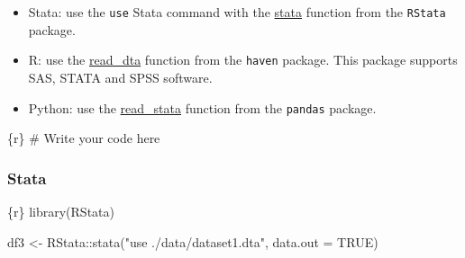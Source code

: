 \documentclass[
  letterpaper,
  DIV=11,
  numbers=noendperiod]{scrreprt}
\newenvironment{Shaded}{\begin{snugshade}}{\end{snugshade}}
\newcommand{\AttributeTok}[1]{\textcolor[rgb]{0.40,0.45,0.13}{#1}}
\newcommand{\CommentTok}[1]{\textcolor[rgb]{0.37,0.37,0.37}{#1}}
\newcommand{\ConstantTok}[1]{\textcolor[rgb]{0.56,0.35,0.01}{#1}}
\newcommand{\FunctionTok}[1]{\textcolor[rgb]{0.28,0.35,0.67}{#1}}
\newcommand{\InformationTok}[1]{\textcolor[rgb]{0.37,0.37,0.37}{#1}}
\newcommand{\NormalTok}[1]{\textcolor[rgb]{0.00,0.23,0.31}{#1}}
\newcommand{\OtherTok}[1]{\textcolor[rgb]{0.00,0.23,0.31}{#1}}
\newcommand{\SpecialCharTok}[1]{\textcolor[rgb]{0.37,0.37,0.37}{#1}}
\newcommand{\StringTok}[1]{\textcolor[rgb]{0.13,0.47,0.30}{#1}}
\providecommand{\tightlist}{%
  \setlength{\itemsep}{0pt}\setlength{\parskip}{0pt}}\usepackage{longtable,booktabs,array}
\begin{document}
\begin{tcolorbox}[enhanced jigsaw, colframe=quarto-callout-tip-color-frame, colback=white, rightrule=.15mm, bottomrule=.15mm, left=2mm, arc=.35mm, coltitle=black, title=\textcolor{quarto-callout-tip-color}{\faLightbulb}\hspace{0.5em}{Tip}, opacitybacktitle=0.6, bottomtitle=1mm, opacityback=0, toptitle=1mm, toprule=.15mm, colbacktitle=quarto-callout-tip-color!10!white, titlerule=0mm, leftrule=.75mm, breakable]

\begin{itemize}
\tightlist
\item
  Stata: use the \texttt{use} Stata command with the
  \href{https://rdrr.io/github/lbraglia/RStata/man/stata.html}{stata}
  function from the \texttt{RStata} package.
\item
  R: use the
  \href{https://haven.tidyverse.org/reference/read_dta.html}{read\_dta}
  function from the \texttt{haven} package. This package supports SAS,
  STATA and SPSS software.
\item
  Python: use the
  \href{https://pandas.pydata.org/docs/reference/api/pandas.read_stata.html}{read\_stata}
  function from the \texttt{pandas} package.
\end{itemize}

\end{tcolorbox}

\begin{Shaded}
\begin{Highlighting}[]
\InformationTok{\textasciigrave{}\textasciigrave{}\textasciigrave{}\{r\}}
\CommentTok{\# Write your code here}
\InformationTok{\textasciigrave{}\textasciigrave{}\textasciigrave{}}
\end{Highlighting}
\end{Shaded}

\hypertarget{stata-2}{%
\subsubsection{Stata}\label{stata-2}}

\begin{Shaded}
\begin{Highlighting}[]
\InformationTok{\textasciigrave{}\textasciigrave{}\textasciigrave{}\{r\}}
\FunctionTok{library}\NormalTok{(RStata)}

\NormalTok{df3 }\OtherTok{\textless{}{-}}\NormalTok{ RStata}\SpecialCharTok{::}\FunctionTok{stata}\NormalTok{(}\StringTok{"use ./data/dataset1.dta"}\NormalTok{,}
                     \AttributeTok{data.out =} \ConstantTok{TRUE}\NormalTok{)}
\InformationTok{\textasciigrave{}\textasciigrave{}\textasciigrave{}}
\end{Highlighting}
\end{Shaded}
\end{document}
